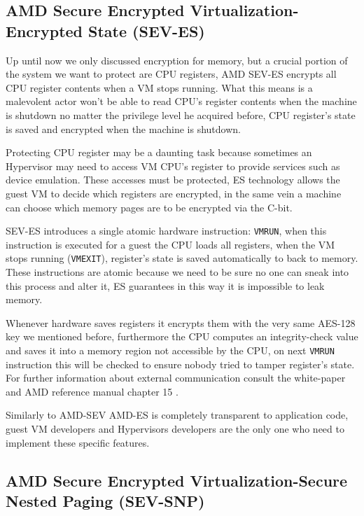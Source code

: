 \documentclass[twocolumn]{article}
\begin{document}
\subsection{AMD Secure Encrypted Virtualization-Encrypted State (SEV-ES)}

Up until now we only discussed encryption for memory, but a crucial portion of the system we want to protect are CPU registers, AMD SEV-ES encrypts all CPU register contents when a VM stops running. What this means is a malevolent actor won't be able to read CPU's register contents when the machine is shutdown no matter the privilege level he acquired before, CPU register's state is saved and encrypted when the machine is shutdown.

Protecting CPU register may be a daunting task because sometimes an Hypervisor may need to access VM CPU's register to provide services such as device emulation. These accesses must be protected, ES technology allows the guest VM to decide which registers are encrypted, in the same vein a machine can choose which memory pages are to be encrypted via the C-bit.

SEV-ES introduces a single atomic hardware instruction: \texttt{VMRUN}, when this instruction is executed for a guest the CPU loads all registers, when the VM stops running (\texttt{VMEXIT}), register's state is saved automatically to  back to memory. These instructions are atomic because we need to be sure no one can sneak into this process and alter it, ES guarantees in this way it is impossible to leak memory.

Whenever hardware saves registers it encrypts them with the very same AES-128 key we mentioned before, furthermore the CPU computes an integrity-check value and saves it into a memory region not accessible by the CPU, on next \texttt{VMRUN} instruction this will be checked to ensure nobody tried to tamper register's state. For further information about external communication consult the white-paper \cite{protecting-registers} and AMD reference manual chapter 15 \cite{architecture-reference}.

Similarly to AMD-SEV AMD-ES is completely transparent to application code, guest VM developers and Hypervisors developers are the only one who  need to implement these specific features.

\subsection{AMD Secure Encrypted Virtualization-Secure Nested Paging (SEV-SNP)}
\end{document}
